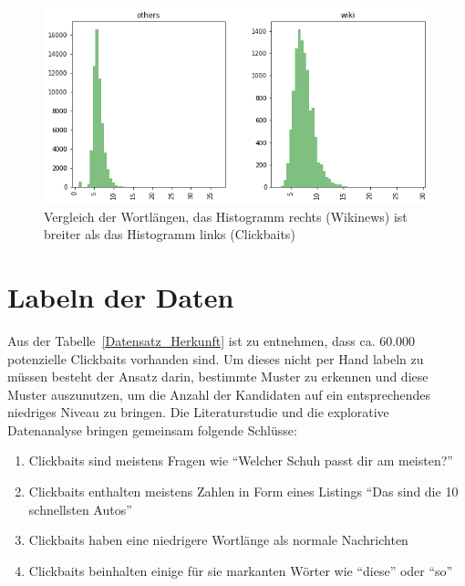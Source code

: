 \begin{figure}[H]
    \centering
    \includegraphics[width=14cm]{kapitel5/hist2.png}
    \caption[Vergleich der Wortlängen der Rohdaten]{Vergleich der Wortlängen, das Histogramm rechts (Wikinews) ist breiter als das Histogramm links (Clickbaits)}
    \label{Kap5:Hist2}
\end{figure}




\section{Labeln der Daten}\label{secLabel}
Aus der Tabelle~\ref{Datensatz_Herkunft} ist zu entnehmen, dass ca. 60.000 potenzielle Clickbaits vorhanden sind. Um dieses nicht per Hand labeln zu müssen besteht der Ansatz darin, bestimmte Muster zu erkennen und diese Muster auszunutzen, um die Anzahl der Kandidaten auf ein entsprechendes niedriges Niveau zu bringen. Die Literaturstudie und die explorative Datenanalyse bringen gemeinsam folgende Schlüsse:

\begin{enumerate}
    \item Clickbaits sind meistens Fragen wie \enquote{Welcher Schuh passt dir am meisten?}
    \item Clickbaits enthalten meistens Zahlen in Form eines Listings \enquote{Das sind die 10 schnellsten Autos}
    \item Clickbaits haben eine niedrigere Wortlänge als normale Nachrichten
    \item Clickbaits beinhalten einige für sie markanten Wörter wie \enquote{diese} oder \enquote{so}
\end{enumerate}

